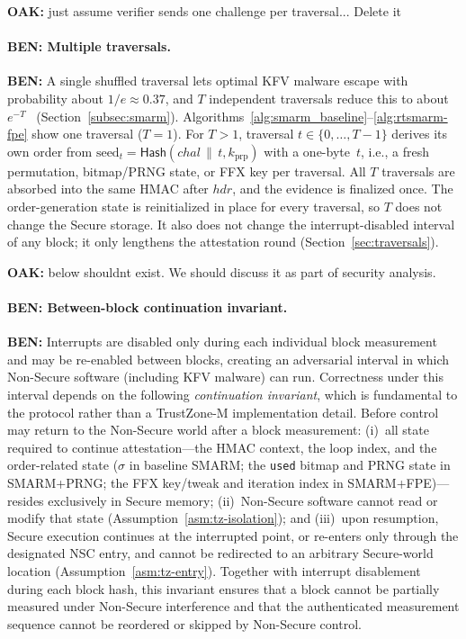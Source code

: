 \documentclass{ieeeaccess}
\DeclareRobustCommand{\oak}[1]{{\color{OAKcolor}\textbf{OAK:} #1}}
\DeclareRobustCommand{\ben}[1]{{\color{BENcolor}\textbf{BEN:} #1}}
\newcommand{\rtsmarmone}{SMARM+PRNG\xspace}
\newcommand{\rtsmarmtwo}{SMARM+FPE\xspace}
\begin{document}
\oak{just assume verifier sends one challenge per traversal... Delete it}
\paragraph{\ben{Multiple traversals.}}
\ben{A single shuffled traversal lets optimal KFV malware escape with probability about $1/e \approx 0.37$, and $T$ independent traversals reduce this to about $e^{-T}$~\cite{smarm} (Section~\ref{subsec:smarm}).
Algorithms~\ref{alg:smarm_baseline}--\ref{alg:rtsmarm-fpe} show one traversal ($T = 1$).
For $T > 1$, traversal $t \in \{0,\ldots,T-1\}$ derives its own order from $\text{seed}_t = \mathsf{Hash}(chal \,\|\, t, k_{\mathrm{prp}})$ with a one-byte~$t$, i.e., a fresh permutation, bitmap/PRNG state, or FFX key per traversal.
All $T$ traversals are absorbed into the same HMAC after $\mathit{hdr}$, and the evidence is finalized once.
The order-generation state is reinitialized in place for every traversal, so $T$ does not change the Secure storage.
It also does not change the interrupt-disabled interval of any block; it only lengthens the attestation round (Section~\ref{sec:traversals}).}

\oak{below shouldnt exist. We should discuss it as part of security analysis.}
\paragraph{\ben{Between-block continuation invariant.}}
\ben{Interrupts are disabled only during each individual block measurement and may be re-enabled between blocks, creating an adversarial interval in which Non-Secure software (including KFV malware) can run.
Correctness under this interval depends on the following \emph{continuation invariant}, which is fundamental to the protocol rather than a TrustZone-M implementation detail.
Before control may return to the Non-Secure world after a block measurement: (i)~all state required to continue attestation---the HMAC context, the loop index, and the order-related state ($\sigma$ in baseline SMARM; the \texttt{used} bitmap and PRNG state in \rtsmarmone; the FFX key/tweak and iteration index in \rtsmarmtwo)---resides exclusively in Secure memory; (ii)~Non-Secure software cannot read or modify that state (Assumption~\ref{asm:tz-isolation}); and (iii)~upon resumption, Secure execution continues at the interrupted point, or re-enters only through the designated NSC entry, and cannot be redirected to an arbitrary Secure-world location (Assumption~\ref{asm:tz-entry}).
Together with interrupt disablement during each block hash, this invariant ensures that a block cannot be partially measured under Non-Secure interference and that the authenticated measurement sequence cannot be reordered or skipped by Non-Secure control.}
\end{document}
